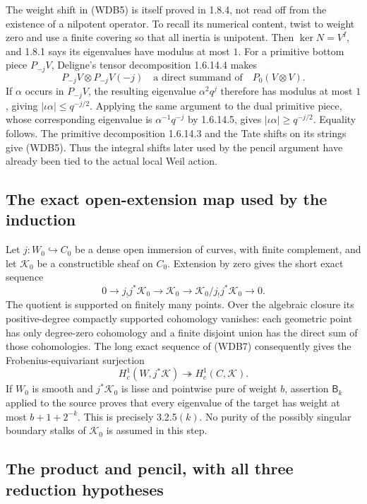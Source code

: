 The weight shift in (WDB5) is itself proved in 1.8.4, not read off
from the existence of a nilpotent operator. To recall its numerical
content, twist to weight zero and use a finite covering so that all
inertia is unipotent. Then \(\ker N=V^I\), and 1.8.1 says its
eigenvalues have modulus at most \(1\). For a primitive bottom
piece \(P_{-j}V\), Deligne's tensor decomposition 1.6.14.4 makes
\[
 P_{-j}V\otimes P_{-j}V(-j)
 \quad\text{a direct summand of}\quad P_0(V\otimes V).
 \tag{WDB6}
\]
If \(\alpha\) occurs in \(P_{-j}V\), the resulting eigenvalue
\(\alpha^2q^j\) therefore has modulus at most \(1\), giving
\(|\iota\alpha|\le q^{-j/2}\). Applying the same argument to
the dual primitive piece, whose corresponding eigenvalue is
\(\alpha^{-1}q^{-j}\) by 1.6.14.5, gives
\(|\iota\alpha|\ge q^{-j/2}\). Equality follows. The primitive
decomposition 1.6.14.3 and the Tate shifts on its strings give (WDB5).
Thus the integral shifts later used by the pencil argument have
already been tied to the actual local Weil action.

\subsection{The exact open-extension map used by the induction}

Let \(j:W_0\hookrightarrow C_0\) be a dense open immersion of
curves, with finite complement, and let \(\mathcal K_0\) be a
constructible sheaf on \(C_0\). Extension by zero gives the short
exact sequence
\[
 0\longrightarrow j_!j^*\mathcal K_0
 \longrightarrow\mathcal K_0
 \longrightarrow \mathcal K_0/j_!j^*\mathcal K_0
 \longrightarrow0.
 \tag{WDB7}
\]
The quotient is supported on finitely many points. Over the algebraic
closure its positive-degree compactly supported cohomology vanishes:
each geometric point has only degree-zero cohomology and a finite
disjoint union has the direct sum of those cohomologies. The long
exact sequence of (WDB7) consequently gives the Frobenius-equivariant
surjection
\[
 H_c^1(W,j^*\mathcal K)
 \twoheadrightarrow H_c^1(C,\mathcal K).
 \tag{WDB8}
\]
If \(W_0\) is smooth and \(j^*\mathcal K_0\) is lisse and
pointwise pure of weight \(b\), assertion \(\mathsf B_k\)
applied to the source proves that every eigenvalue of the target has
weight at most \(b+1+2^{-k}\). This is precisely 3.2.5\((k)\).
No purity of the possibly singular boundary stalks of
\(\mathcal K_0\) is assumed in this step.

\subsection{The product and pencil, with all three reduction hypotheses}

